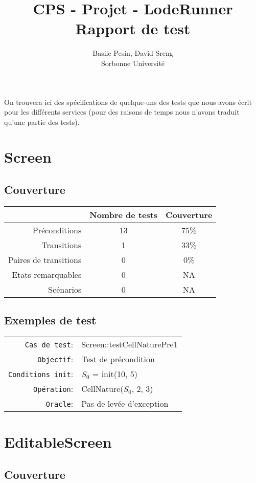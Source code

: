 \documentclass{article}
\title{CPS - Projet - LodeRunner\\Rapport de test}
\author{Basile Pesin, David Sreng\\Sorbonne Université}
\begin{document}
\maketitle

On trouvera ici des spécifications de quelque-uns des tests que nous avons écrit pour les différents services (pour des raisons de temps nous n'avons traduit qu'une partie des tests).

\section{Screen}

\subsection{Couverture}

\begin{longtable}{r|cc}
  &Nombre de tests&Couverture\\
  \hline
  Préconditions & 13 & 75\%\\
  Transitions & 1 & 33\%\\
  Paires de transitions &0& 0\%\\
  Etats remarquables &0& NA\\
  Scénarios &0& NA\\
\end{longtable}

\subsection{Exemples de test}

{\small
  \begin{longtable}{rl}
    \texttt{Cas de test}: &\textrm{Screen::testCellNaturePre1}\\
    \texttt{Objectif}: & Test de précondition\\
    \texttt{Conditions init}: & $S_0$ = \textrm{init(10, 5)}\\
    \texttt{Opération}: &\textrm{CellNature($S_0$, 2, 3)}\\
    \texttt{Oracle}: & Pas de levée d'exception\\
  \end{longtable}}

\section{EditableScreen}

\subsection{Couverture}
\end{document}
